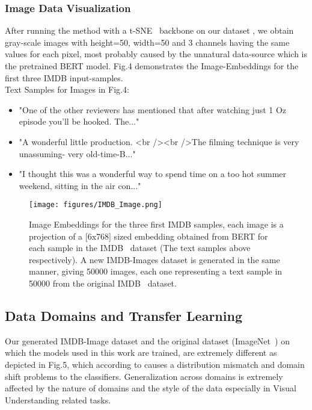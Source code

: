 \documentclass[conference]{IEEEtran}
\begin{document}
                
\subsubsection{Image Data Visualization}
                After running the method with a t-SNE~\cite{tsne} backbone on our dataset , we obtain gray-scale images with height=50, width=50 and 3 
				channels having the same values for each pixel, most probably caused by the unnatural data-source which is the pretrained BERT model.
				Fig.4 demonstrates the Image-Embeddings for the first three IMDB input-samples.\\
				Text Samples for Images in Fig.4:\\
				\begin{itemize}
				    \item "One of the other reviewers has mentioned that after watching just 1 Oz episode you'll be hooked. The..."
				    \item "A wonderful little production. <br /><br />The filming technique is very unassuming- very old-time-B..." 
				    \item "I thought this was a wonderful way to spend time on a too hot summer 
				weekend, sitting in the air con..."
				\end{itemize}
				 
				\begin{figure}[htbp]
                \centerline{\texttt{[image: figures/IMDB\_Image.png]}}
                \caption{Image Embeddings for the three first IMDB samples, each image is a projection of a [6x768] sized embedding obtained from BERT for each sample in the IMDB~\cite{imdb} dataset (The text samples above respectively). A new IMDB-Images dataset is generated in the same manner, giving 50000 images, each one representing a text sample in 50000 from the original IMDB~\cite{imdb} dataset.}
                \label{figure-2-1}
                \end{figure}

\subsection{Data Domains and Transfer Learning}		
				Our generated IMDB-Image dataset and the original dataset (ImageNet~\cite{imagenet}) on which
			    the models used in this work are trained, are extremely different
			    as depicted in Fig.5, which according to \cite{domainshift} causes a 
			    distribution mismatch and domain shift problems to the classifiers. 
			    Generalization across domains is extremely affected by the nature of domains and the style of the data especially in Visual Understanding related tasks.
			    
\end{document}
